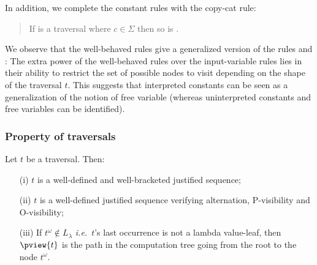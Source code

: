 In addition, we complete the constant rules with the  copy-cat rule:
\begin{quote}
 If 
is a traversal where $c\in\Sigma$ then so is .
\end{quote}




\begin{remark}
    We observe that the well-behaved rules give a generalized
    version of the rules  and : The extra power of the well-behaved rules over the input-variable rules lies in their ability to restrict the set of possible nodes to visit depending on the shape of the traversal $t$.
    This suggests that interpreted constants can be seen as a generalization of the notion of free variable (whereas uninterpreted constants and free variables can be identified).
\end{remark}

\subsubsection{Property of traversals}

\begin{proposition}
\label{prop:pviewtrav_is_path}
Let $t$ be a traversal. Then:
\begin{itemize}
\item[(i)] $t$ is a well-defined and well-bracketed justified sequence;
\item[(ii)] $t$ is a well-defined justified sequence verifying alternation, P-visibility and O-visibility;
\item[(iii)] If $t^\omega \not\in L_\lambda$ {\it i.e.}~$t$'s last occurrence is not a lambda value-leaf, then $\pview{t}$ is the path in the computation tree going from the root to the node $t^\omega$.
\end{itemize}
\end{proposition}

